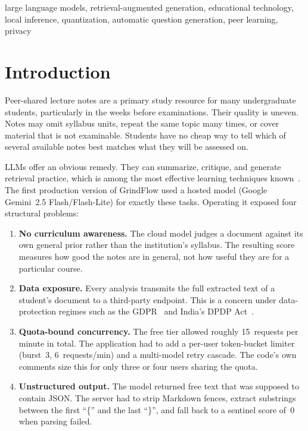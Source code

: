 \documentclass[conference]{IEEEtran}
\begin{document}
\begin{IEEEkeywords}
large language models, retrieval-augmented generation, educational technology,
local inference, quantization, automatic question generation, peer learning,
privacy
\end{IEEEkeywords}

\section{Introduction}

Peer-shared lecture notes are a primary study resource for many undergraduate
students, particularly in the weeks before examinations. Their quality is
uneven. Notes may omit syllabus units, repeat the same topic many times, or
cover material that is not examinable. Students have no cheap way to tell
which of several available notes best matches what they will be assessed on.

LLMs offer an obvious remedy. They can summarize, critique, and generate
retrieval practice, which is among the most effective learning techniques
known~\cite{roediger2006test,dunlosky2013improving}. The first
production version of GrindFlow used a hosted model (Google Gemini~2.5
Flash/Flash-Lite) for exactly these tasks. Operating it exposed four
structural problems:

\begin{enumerate}
\item \textbf{No curriculum awareness.} The cloud model judges a document
against its own general prior rather than the institution's syllabus. The
resulting score measures how good the notes are in general, not how useful
they are for a particular course.
\item \textbf{Data exposure.} Every analysis transmits the full extracted
text of a student's document to a third-party endpoint. This is a concern
under data-protection regimes such as the GDPR~\cite{gdpr2016} and India's
DPDP Act~\cite{dpdp2023}.
\item \textbf{Quota-bound concurrency.} The free tier allowed roughly
15~requests per minute in total. The application had to add a per-user
token-bucket limiter (burst~3, 6~requests/min) and a multi-model retry
cascade. The code's own comments size this for only three or four users
sharing the quota.
\item \textbf{Unstructured output.} The model returned free text that was
supposed to contain JSON. The server had to strip Markdown fences, extract
substrings between the first ``\{'' and the last ``\}'', and fall back to a
sentinel score of~0 when parsing failed.
\end{enumerate}
\end{document}
